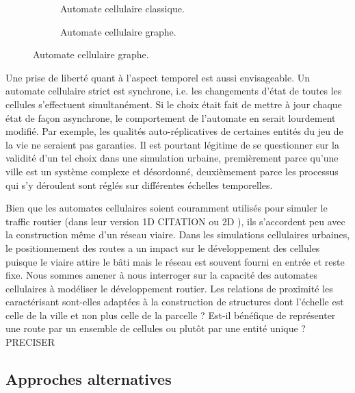 \documentclass[12pt]{article}
\begin{document}
\begin{figure}
  \begin{subfigure}[b]{.5\linewidth}
    \centering
    
    \caption{Automate cellulaire classique.}
  \end{subfigure}
  \begin{subfigure}[b]{.5\linewidth}
    \centering
    
    \caption{Automate cellulaire graphe.}
  \end{subfigure}
\end{figure}

Une prise de liberté quant à l'aspect temporel est aussi
envisageable. Un automate cellulaire strict est synchrone, i.e. les
changements d'état de toutes les cellules s'effectuent
simultanément. Si le choix était fait de mettre à jour chaque état de
façon asynchrone, le comportement de l'automate en serait lourdement
modifié. Par exemple, les qualités auto-réplicatives de certaines
entités du jeu de la vie ne seraient pas garanties. Il est pourtant
légitime de se questionner sur la validité d'un tel choix dans une
simulation urbaine, premièrement parce qu'une ville est un système
complexe et désordonné, deuxièmement parce les processus qui s'y
déroulent sont réglés sur différentes échelles temporelles.

Bien que les automates cellulaires soient couramment utilisés pour
simuler le traffic routier (dans leur version 1D CITATION ou 2D
\cite{Queloz1996}), ils s'accordent peu avec la construction même d'un
réseau viaire. Dans les simulations cellulaires urbaines, le
positionnement des routes a un impact sur le développement des
cellules puisque le viaire attire le bâti mais le réseau est souvent
fourni en entrée et reste fixe. Nous sommes amener à nous interroger
sur la capacité des automates cellulaires à modéliser le développement
routier. Les relations de proximité les caractérisant sont-elles
adaptées à la construction de structures dont l'échelle est celle de
la ville et non plus celle de la parcelle ? Est-il bénéfique de
représenter une route par un ensemble de cellules ou plutôt par une
entité unique ? PRECISER

\subsection{Approches alternatives}
\end{document}
